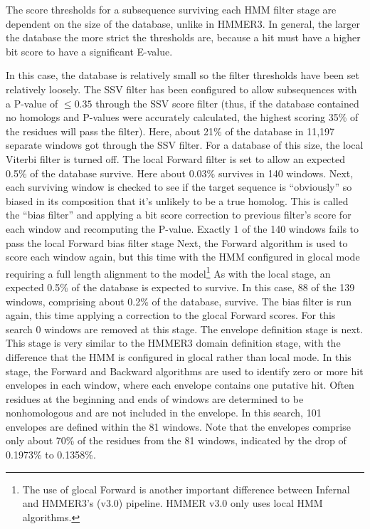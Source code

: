 The score thresholds for a subsequence surviving each HMM filter stage
are dependent on the size of the database, unlike in HMMER3. In
general, the larger the database the more strict the thresholds
are, because a hit must have a higher bit score to have a
significant E-value. 

In this case, the database is relatively small so the filter
thresholds have been set relatively loosely. The SSV filter has been
configured to allow subsequences with a P-value of $\leq 0.35$ through
the SSV score filter (thus, if the database contained no homologs and
P-values were accurately calculated, the highest scoring 35\% of the
residues will pass the filter). Here, about 21\% of the database in
11,197 separate windows got through the SSV filter. For a database of
this size, the local Viterbi filter is turned off.  The local Forward filter
is set to allow an expected 0.5\% of the database survive. Here about
0.03\% survives in 140 windows. Next, each surviving window is checked
to see if the target sequence is ``obviously'' so biased in its
composition that it's unlikely to be a true homolog. This is called
the ``bias filter'' and applying a bit score correction to previous
filter's score for each window and recomputing the P-value.
Exactly 1 of the 140 windows fails to pass the local Forward bias filter stage
Next, the Forward algorithm is used to score each window again, but
this time with the HMM configured in glocal mode requiring a full
length alignment to the model\footnote{The use of glocal Forward is
another important difference between Infernal and HMMER3's (v3.0)
pipeline. HMMER v3.0 only uses local HMM algorithms.}  As with the
local stage, an expected 0.5\% of the database is expected to
survive. In this case, 88 of the 139 windows, comprising about 0.2\%
of the database, survive. The bias filter is run again, this time
applying a correction to the glocal Forward scores. For this search 0
windows are removed at this stage. The envelope definition stage is
next. This stage is very similar to the HMMER3 domain definition
stage, with the difference that the HMM is configured in glocal rather
than local mode. In this stage, the Forward and Backward algorithms
are used to identify zero or more hit envelopes in each window, where
each envelope contains one putative hit.  Often residues at the
beginning and ends of windows are determined to be nonhomologous and
are not included in the envelope. In this search, 101 envelopes are
defined within the 81 windows. Note that the envelopes comprise only
about 70\% of the residues from the 81 windows, indicated by the drop
of 0.1973\% to 0.1358\%. 

